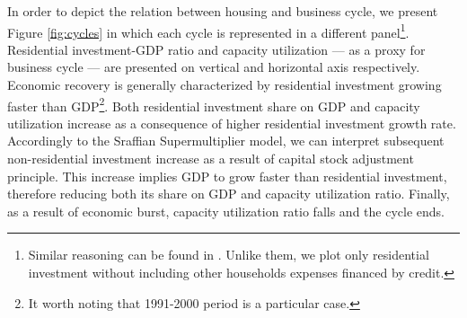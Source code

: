 \documentclass[11pt]{article}
\begin{document}
In order to depict the relation between housing and business cycle, we present Figure \ref{fig:cycles} in which each cycle is represented in a different panel\footnote{Similar reasoning can be found in \textcite{fiebiger_trend_2017}. Unlike them, we plot only residential investment without including other households expenses financed by credit.}.
Residential investment-GDP ratio and capacity utilization --- as a proxy for business cycle --- are presented on vertical and horizontal axis respectively.
Economic recovery is generally characterized by residential investment growing faster than GDP\footnote{It worth noting that 1991-2000 period is a particular case.}. Both residential investment share on GDP and capacity utilization increase as a consequence of higher residential investment growth rate.
Accordingly to the Sraffian Supermultiplier model, we can interpret subsequent non-residential investment increase as a result of capital stock adjustment principle. 
This increase implies GDP to grow faster than residential investment, therefore reducing both its share on GDP and capacity utilization ratio. Finally, as a result of economic burst, capacity utilization ratio falls and the cycle ends.
\end{document}
